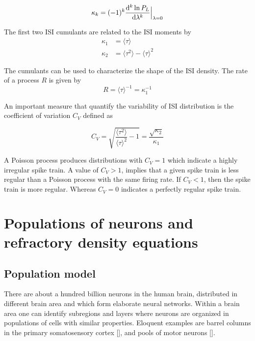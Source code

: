 \documentclass[12pt,twoside]{report}
\def \dd  {{\rm d}}
\begin{document}
\begin{equation}
\label{eq:Pcumulant}
\kappa_k=(-1)^k\frac{\dd^k \ln P_L}{\dd \lambda^k}\Bigr|_{\lambda=0}
\end{equation}

The first two ISI cumulants are related to the ISI moments by
\begin{align}
\label{eq:kappa1234}
\kappa_1&=\langle\tau\rangle\\
\kappa_2&=\langle\tau^2\rangle-\langle\tau\rangle^2
\end{align}


The cumulants can be used to characterize the shape of the ISI density. The rate of a process $R$ is given by
\begin{equation}
\label{eq:R}
R=\langle\tau\rangle^{-1}=\kappa_1^{-1}
\end{equation}

An important measure that quantify the variability of ISI distribution is the coefficient of variation $C_V$ defined as


\begin{equation}
\label{eq:CV}
C_V=\sqrt{\frac{\langle\tau^2\rangle}{\langle\tau\rangle^2}-1}=\frac{\sqrt{\kappa_2}}{\kappa_1}
\end{equation}

A Poisson process produces distributions with $C_V=1$ which indicate a highly irregular spike train. A value of $C_V>1$, implies that a given spike train is less regular than a Poisson process with the same firing rate. If $C_V<1$, then the spike train is more regular. Whereas $C_V=0$ indicates a perfectly regular spike train.


\section{Populations of neurons and refractory density equations}
\label{sec:refractory}
\subsection{Population model}

There are about a hundred billion neurons in the human brain, distributed in different brain area and which form elaborate neural networks. Within a brain area one can identify subregions and layers where neurons are organized in populations of cells with similar properties. Eloquent examples are barrel columns in the primary somatosensory cortex [\cite{Lef09}], and pools of motor neurons [\cite{KanSch00}].
\end{document}
